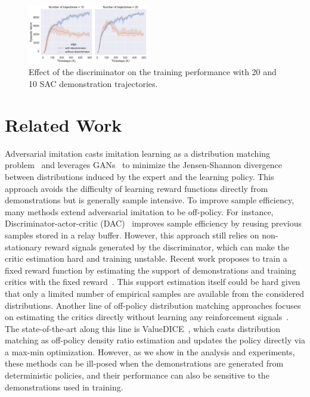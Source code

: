 \documentclass[letterpaper]{article} %
\begin{document}
\begin{figure}
\centering
\includegraphics[width=0.81\linewidth,height=1.03in ]{ablation.pdf}
\caption{Effect of the discriminator on the training performance with 20 and 10 SAC demonstration trajectories.}
\label{fig:ablation-discriminator}
\end{figure}


\vspace{-1.87mm}
\section{Related Work}
Adversarial imitation casts imitation learning as a distribution matching problem~\cite{ho2016generative} and leverages GANs~\cite{goodfellow2014generative} to minimize the Jensen-Shannon divergence between distributions induced by the expert and the learning policy.
This approach avoids the difficulty of learning reward functions directly from demonstrations but is generally sample intensive.
To improve sample efficiency, many methods extend adversarial imitation to be off-policy.
For instance, Discriminator-actor-critic (DAC)~\cite{kostrikov2018discriminator,sasaki2018sample} improves sample efficiency by reusing previous samples stored in a relay buffer.
However, this approach still relies on non-stationary reward signals generated by the discriminator, which can make the critic estimation hard and training unstable.
Recent work proposes to train a fixed reward function by estimating the support of demonstrations and training  critics with the fixed reward~\cite{wang2019random}.
This support estimation itself could be hard given that only a limited number of empirical samples are available from the considered distributions.
Another line of off-policy distribution matching approaches focuses on estimating the critics directly without learning any reinforcement signals~\cite{sasaki2018sample,kostrikov2019imitation}.
The state-of-the-art along this line is  ValueDICE~\cite{kostrikov2019imitation}, which casts distribution matching as off-policy density ratio estimation and updates the policy directly via a max-min optimization.
However, as we show in the analysis and experiments, these methods can be ill-posed when the demonstrations are generated from deterministic policies, and their performance can also be sensitive to the demonstrations used in training.
\end{document}
